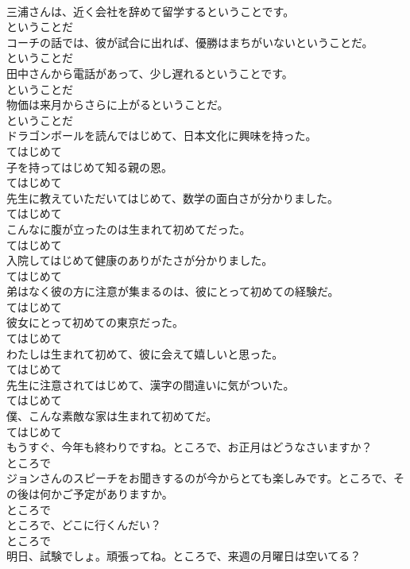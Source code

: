 \documentclass[8pt]{extreport}
\begin{document}
\begin{CJK}{UTF8}{min}
\\	三浦さんは、近く会社を辞めて留学するということです。	
\\	ということだ
\\	コーチの話では、彼が試合に出れば、優勝はまちがいないということだ。	
\\	ということだ
\\	田中さんから電話があって、少し遅れるということです。	
\\	ということだ
\\	物価は来月からさらに上がるということだ。	
\\	ということだ
\\	ドラゴンボールを読んではじめて、日本文化に興味を持った。	
\\	てはじめて
\\	子を持ってはじめて知る親の恩。	
\\	てはじめて
\\	先生に教えていただいてはじめて、数学の面白さが分かりました。	
\\	てはじめて
\\	こんなに腹が立ったのは生まれて初めてだった。	
\\	てはじめて
\\	入院してはじめて健康のありがたさが分かりました。	
\\	てはじめて
\\	弟はなく彼の方に注意が集まるのは、彼にとって初めての経験だ。	
\\	てはじめて
\\	彼女にとって初めての東京だった。	
\\	てはじめて
\\	わたしは生まれて初めて、彼に会えて嬉しいと思った。	
\\	てはじめて
\\	先生に注意されてはじめて、漢字の間違いに気がついた。	
\\	てはじめて
\\	僕、こんな素敵な家は生まれて初めてだ。	
\\	てはじめて
\\	もうすぐ、今年も終わりですね。ところで、お正月はどうなさいますか？	
\\	ところで
\\	ジョンさんのスピーチをお聞きするのが今からとても楽しみです。ところで、その後は何かご予定がありますか。	
\\	ところで
\\	ところで、どこに行くんだい？	
\\	ところで
\\	明日、試験でしょ。頑張ってね。ところで、来週の月曜日は空いてる？	

\end{CJK}
\end{document}
